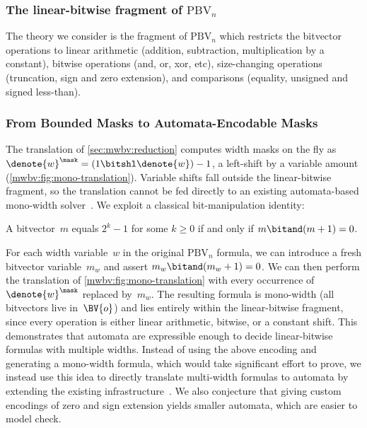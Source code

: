 \subsubsection{The linear-bitwise fragment of $\text{PBV}_n$}

The theory we consider is the fragment of $\text{PBV}_n$ which restricts the
bitvector operations to linear arithmetic (addition, subtraction,
multiplication by a constant), bitwise operations (and, or, xor, etc),
size-changing operations (truncation, sign and zero extension), and comparisons (equality, unsigned and signed less-than).

\subsubsection{From Bounded Masks to Automata-Encodable Masks}
\label{mwbv:sec:mask-substitution}

The translation of \cref{sec:mwbv:reduction} computes width masks on the fly as
$\denote{w}^\mask = (1 \bitshl \denote{w}) - 1$, a left-shift by a variable
amount (\cref{mwbv:fig:mono-translation}).  Variable shifts fall outside the
linear-bitwise fragment, so the translation cannot be fed directly to an existing
automata-based mono-width solver~\citep{bhat2025certified}.
%
We exploit a classical bit-manipulation identity:
%
\begin{lemma}\label{mwbv:lem:mask-char}
  A bitvector~$m$ equals $2^k - 1$ for some $k \geq 0$
  if and only if $m \bitand (m + 1) = 0$.
\end{lemma}
%
\noindent
For each width variable~$w$ in the original $\text{PBV}_n$ formula, we
can introduce a fresh bitvector variable~$m_w$ and assert
$m_w \bitand (m_w + 1) = 0$.
We can then perform the translation of \cref{mwbv:fig:mono-translation}
with every occurrence of~$\denote{w}^\mask$ replaced by~$m_w$.
The resulting formula is mono-width (all bitvectors live in~$\BV{o}$)
and lies entirely within the linear-bitwise fragment,
since every operation is either linear arithmetic, bitwise, or a constant shift.
%
This demonstrates that automata are expressible enough to decide linear-bitwise
formulas with multiple widths.
%
Instead of using the above encoding and generating a mono-width formula, which
would take significant effort to prove, we instead use this idea to directly
translate multi-width formulas to automata by extending the existing
infrastructure~\citep{bhat2025certified}.
%
We also conjecture that giving custom encodings of zero and sign extension yields
smaller automata, which are easier to model check.

